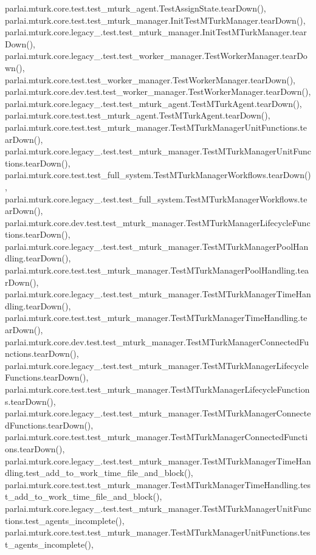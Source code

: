 parlai.\+mturk.\+core.\+test.\+test\+\_\+mturk\+\_\+agent.\+Test\+Assign\+State.\+tear\+Down(), parlai.\+mturk.\+core.\+test.\+test\+\_\+mturk\+\_\+manager.\+Init\+Test\+M\+Turk\+Manager.\+tear\+Down(), parlai.\+mturk.\+core.\+legacy\+\_.\+test.\+test\+\_\+mturk\+\_\+manager.\+Init\+Test\+M\+Turk\+Manager.\+tear\+Down(), parlai.\+mturk.\+core.\+legacy\+\_.\+test.\+test\+\_\+worker\+\_\+manager.\+Test\+Worker\+Manager.\+tear\+Down(), parlai.\+mturk.\+core.\+test.\+test\+\_\+worker\+\_\+manager.\+Test\+Worker\+Manager.\+tear\+Down(), parlai.\+mturk.\+core.\+dev.\+test.\+test\+\_\+worker\+\_\+manager.\+Test\+Worker\+Manager.\+tear\+Down(), parlai.\+mturk.\+core.\+legacy\+\_.\+test.\+test\+\_\+mturk\+\_\+agent.\+Test\+M\+Turk\+Agent.\+tear\+Down(), parlai.\+mturk.\+core.\+test.\+test\+\_\+mturk\+\_\+agent.\+Test\+M\+Turk\+Agent.\+tear\+Down(), parlai.\+mturk.\+core.\+test.\+test\+\_\+mturk\+\_\+manager.\+Test\+M\+Turk\+Manager\+Unit\+Functions.\+tear\+Down(), parlai.\+mturk.\+core.\+legacy\+\_.\+test.\+test\+\_\+mturk\+\_\+manager.\+Test\+M\+Turk\+Manager\+Unit\+Functions.\+tear\+Down(), parlai.\+mturk.\+core.\+test.\+test\+\_\+full\+\_\+system.\+Test\+M\+Turk\+Manager\+Workflows.\+tear\+Down(), parlai.\+mturk.\+core.\+legacy\+\_.\+test.\+test\+\_\+full\+\_\+system.\+Test\+M\+Turk\+Manager\+Workflows.\+tear\+Down(), parlai.\+mturk.\+core.\+dev.\+test.\+test\+\_\+mturk\+\_\+manager.\+Test\+M\+Turk\+Manager\+Lifecycle\+Functions.\+tear\+Down(), parlai.\+mturk.\+core.\+legacy\+\_.\+test.\+test\+\_\+mturk\+\_\+manager.\+Test\+M\+Turk\+Manager\+Pool\+Handling.\+tear\+Down(), parlai.\+mturk.\+core.\+test.\+test\+\_\+mturk\+\_\+manager.\+Test\+M\+Turk\+Manager\+Pool\+Handling.\+tear\+Down(), parlai.\+mturk.\+core.\+legacy\+\_.\+test.\+test\+\_\+mturk\+\_\+manager.\+Test\+M\+Turk\+Manager\+Time\+Handling.\+tear\+Down(), parlai.\+mturk.\+core.\+test.\+test\+\_\+mturk\+\_\+manager.\+Test\+M\+Turk\+Manager\+Time\+Handling.\+tear\+Down(), parlai.\+mturk.\+core.\+dev.\+test.\+test\+\_\+mturk\+\_\+manager.\+Test\+M\+Turk\+Manager\+Connected\+Functions.\+tear\+Down(), parlai.\+mturk.\+core.\+legacy\+\_.\+test.\+test\+\_\+mturk\+\_\+manager.\+Test\+M\+Turk\+Manager\+Lifecycle\+Functions.\+tear\+Down(), parlai.\+mturk.\+core.\+test.\+test\+\_\+mturk\+\_\+manager.\+Test\+M\+Turk\+Manager\+Lifecycle\+Functions.\+tear\+Down(), parlai.\+mturk.\+core.\+legacy\+\_.\+test.\+test\+\_\+mturk\+\_\+manager.\+Test\+M\+Turk\+Manager\+Connected\+Functions.\+tear\+Down(), parlai.\+mturk.\+core.\+test.\+test\+\_\+mturk\+\_\+manager.\+Test\+M\+Turk\+Manager\+Connected\+Functions.\+tear\+Down(), parlai.\+mturk.\+core.\+legacy\+\_.\+test.\+test\+\_\+mturk\+\_\+manager.\+Test\+M\+Turk\+Manager\+Time\+Handling.\+test\+\_\+add\+\_\+to\+\_\+work\+\_\+time\+\_\+file\+\_\+and\+\_\+block(), parlai.\+mturk.\+core.\+test.\+test\+\_\+mturk\+\_\+manager.\+Test\+M\+Turk\+Manager\+Time\+Handling.\+test\+\_\+add\+\_\+to\+\_\+work\+\_\+time\+\_\+file\+\_\+and\+\_\+block(), parlai.\+mturk.\+core.\+legacy\+\_.\+test.\+test\+\_\+mturk\+\_\+manager.\+Test\+M\+Turk\+Manager\+Unit\+Functions.\+test\+\_\+agents\+\_\+incomplete(), parlai.\+mturk.\+core.\+test.\+test\+\_\+mturk\+\_\+manager.\+Test\+M\+Turk\+Manager\+Unit\+Functions.\+test\+\_\+agents\+\_\+incomplete(), 